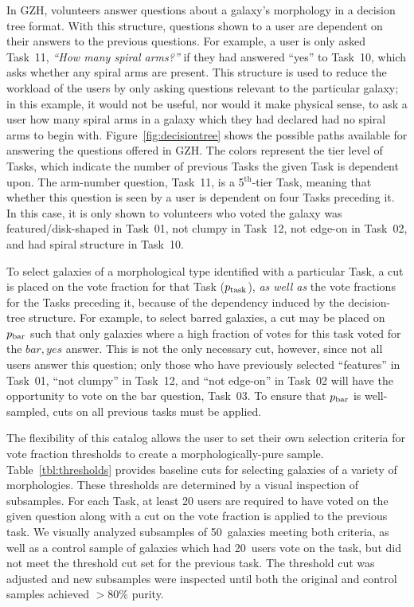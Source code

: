 \documentclass[twocolumn]{aastex6}
\begin{document}
In GZH, volunteers answer questions about a galaxy's morphology in a decision tree format. With this structure, questions shown to a user are dependent on their answers to the previous questions. For example, a user is only asked Task~11, {\it ``How many spiral arms?''} if they had answered ``yes'' to Task~10, which asks whether any spiral arms are present. This structure is used to reduce the workload of the users by only asking questions relevant to the particular galaxy; in this example, it would not be useful, nor would it make physical sense, to ask a user how many spiral arms in a galaxy which they had declared had no spiral arms to begin with. Figure~\ref{fig:decisiontree} shows the possible paths available for answering the questions offered in GZH. The colors represent the tier level of Tasks, which indicate the number of previous Tasks the given Task is dependent upon. The arm-number question, Task~11, is a 5$^\mathrm{th}$-tier Task, meaning that whether this question is seen by a user is dependent on four Tasks preceding it. In this case, it is only shown to volunteers who voted the galaxy was featured/disk-shaped in Task~01, not clumpy in Task~12, not edge-on in Task~02, and had spiral structure in Task~10.  

To select galaxies of a morphological type identified with a particular Task, a cut is placed on the vote fraction for that Task ($p_{\rm task}$), \emph{as well as} the vote fractions for the Tasks preceding it, because of the dependency induced by the decision-tree structure. For example, to select barred galaxies, a cut may be placed on $p_{\rm bar}$ such that only galaxies where a high fraction of votes for this task voted for the $bar,yes$ answer. This is not the only necessary cut, however, since not all users answer this question; only those who have previously selected ``features'' in Task~01, ``not clumpy'' in Task~12, and ``not edge-on'' in Task~02 will have the opportunity to vote on the bar question, Task~03. To ensure that $p_{\rm bar}$ is well-sampled, cuts on all previous tasks must be applied. 

The flexibility of this catalog allows the user to set their own selection criteria for vote fraction thresholds to create a morphologically-pure sample. Table~\ref{tbl:thresholds} provides baseline cuts for selecting galaxies of a variety of morphologies. These thresholds are determined by a visual inspection of subsamples. For each Task, at least 20 users are required to have voted on the given question along with a cut on the vote fraction is applied to the previous task. We visually analyzed subsamples of 50~galaxies meeting both criteria, as well as a control sample of galaxies which had 20~users vote on the task, but did not meet the threshold cut set for the previous task. The threshold cut was adjusted and new subsamples were inspected until both the original and control samples achieved $>80\%$ purity.
\end{document}
